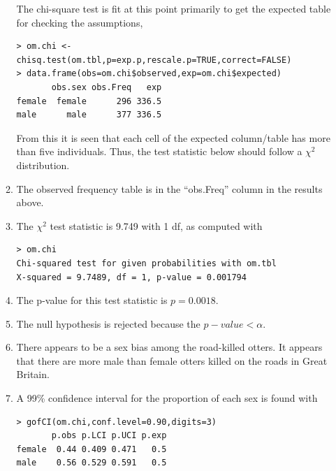 \documentclass[10pt,openany]{book}\usepackage[]{graphicx}\usepackage[]{color}
\makeatletter
\newenvironment{kframe}{%
 \def\at@end@of@kframe{}%
 \ifinner\ifhmode%
  \def\at@end@of@kframe{\end{minipage}}%
  \begin{minipage}{\columnwidth}%
 \fi\fi%
 \def\FrameCommand##1{\hskip\@totalleftmargin \hskip-\fboxsep
 \colorbox{shadecolor}{##1}\hskip-\fboxsep
     \hskip-\linewidth \hskip-\@totalleftmargin \hskip\columnwidth}%
 \MakeFramed {\advance\hsize-\width
   \@totalleftmargin\z@ \linewidth\hsize
   \@setminipage}}%
 {\par\unskip\endMakeFramed%
 \at@end@of@kframe}
\newenvironment{knitrout}{}{} %
\makeatother
\begin{document}
\begin{itemize}
\begin{enumerate}
The chi-square test is fit at this point primarily to get the expected table for checking the assumptions,
\begin{knitrout}
\color{fgcolor}\begin{kframe}
\begin{verbatim}
> om.chi <- chisq.test(om.tbl,p=exp.p,rescale.p=TRUE,correct=FALSE)
> data.frame(obs=om.chi$observed,exp=om.chi$expected)
       obs.sex obs.Freq   exp
female  female      296 336.5
male      male      377 336.5
\end{verbatim}
\end{kframe}
\end{knitrout}
From this it is seen that each cell of the expected column/table has more than five individuals.  Thus, the test statistic below should follow a $\chi^{2}$ distribution.
      \item The observed frequency table is in the ``obs.Freq'' column in the results above.
      \item The $\chi^{2}$ test statistic is 9.749 with 1 df, as computed with
\begin{knitrout}
\color{fgcolor}\begin{kframe}
\begin{verbatim}
> om.chi
Chi-squared test for given probabilities with om.tbl 
X-squared = 9.7489, df = 1, p-value = 0.001794
\end{verbatim}
\end{kframe}
\end{knitrout}
      \item The p-value for this test statistic is $p=0.0018$.
      \item The null hypothesis is rejected because the $p-value<\alpha$.
      \item There appears to be a sex bias among the road-killed otters.  It appears that there are more male than female otters killed on the roads in Great Britain.
      \item A 99\% confidence interval for the proportion of each sex is found with
\begin{knitrout}
\color{fgcolor}\begin{kframe}
\begin{verbatim}
> gofCI(om.chi,conf.level=0.90,digits=3)
       p.obs p.LCI p.UCI p.exp
female  0.44 0.409 0.471   0.5
male    0.56 0.529 0.591   0.5
\end{verbatim}

\end{kframe}
\end{knitrout}
\end{enumerate}
\end{itemize}
\end{document}
